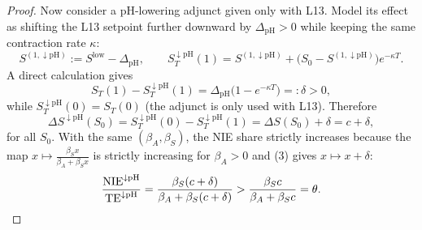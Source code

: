 \begin{proof}
Now consider a pH-lowering adjunct given only with L13. Model its effect as shifting the L13 setpoint further downward by $\Delta_{\mathrm{pH}}>0$ while keeping the same contraction rate $\kappa$:
\[
S^{(1,\downarrow\mathrm{pH})}:=S^{\mathrm{low}}-\Delta_{\mathrm{pH}},\qquad
S_T^{\downarrow\mathrm{pH}}(1)=S^{(1,\downarrow\mathrm{pH})}+\big(S_0-S^{(1,\downarrow\mathrm{pH})}\big)e^{-\kappa T}.
\]
A direct calculation gives
\[
S_T(1)-S_T^{\downarrow\mathrm{pH}}(1)=\Delta_{\mathrm{pH}}\big(1-e^{-\kappa T}\big)=:\delta>0,
\]
while $S_T^{\downarrow\mathrm{pH}}(0)=S_T(0)$ (the adjunct is only used with L13). Therefore
\[
\Delta S^{\downarrow\mathrm{pH}}(S_0)=S_T^{\downarrow\mathrm{pH}}(0)-S_T^{\downarrow\mathrm{pH}}(1)=\Delta S(S_0)+\delta=c+\delta,\tag{3}
\]
for all $S_0$. With the same $(\beta_A,\beta_S)$, the NIE share strictly increases because the map $x\mapsto \tfrac{\beta_S x}{\beta_A+\beta_S x}$ is strictly increasing for $\beta_A>0$ and (3) gives $x\mapsto x+\delta$:
\[
\frac{\mathrm{NIE}^{\downarrow\mathrm{pH}}}{\mathrm{TE}^{\downarrow\mathrm{pH}}}
=\frac{\beta_S(c+\delta)}{\beta_A+\beta_S(c+\delta)}
>\frac{\beta_S c}{\beta_A+\beta_S c}=\theta.\qedhere
\]
\end{proof}
